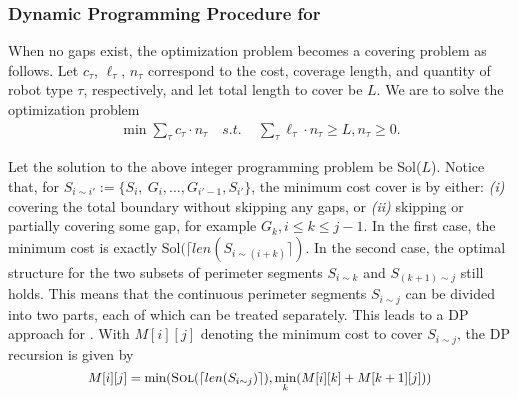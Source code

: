 \subsubsection{Dynamic Programming Procedure for \opgmc}
\def\sol{{\sc Sol}}
\def\presol{{\sc PreSolve}}
When no gaps exist, the optimization problem becomes a covering 
problem as follows. Let $c_{\tau}$, $\ell_{\tau}$, $n_{\tau}$ correspond to the cost, 
coverage length, and quantity of robot type ${\tau}$, respectively, and let total 
length to cover be $L$. We are to solve the optimization problem
\begin{align}\label{eq:opgext-ip}
    \min \sum_{\tau} c_{\tau} \cdot n_{\tau} \quad s.t.\, \quad
    \sum_{\tau} \ell_{\tau} \cdot n_{\tau} \geq L, n_{\tau}\geq 0.
\end{align}

Let the solution to the above integer programming problem be \sol($L$).
Notice that, for $S_{i\sim i'}:=\{S_i,\ G_i, \dots, 
G_{i'-1}, S_{i'}\}$, the minimum cost cover is by either: {\em (i)} 
covering the total boundary without skipping any gaps, 
%
or {\em (ii)} skipping or partially covering some gap, for example $G_k, 
i \le k \le j-1$.
%
In the first case, the minimum cost is exactly \sol$(\lceil len(S_{i\sim(i+k)}\rceil)$.
%
In the second case, the optimal structure for the two subsets of perimeter 
segments $S_{i\sim k}$ and $S_{(k+1)\sim j}$ still holds. This means that the 
continuous perimeter segments $S_{i\sim j}$ can be divided into two parts, 
each of which can be treated separately. This leads to a DP approach for \opgmc.
With $M[i][j]$ denoting the minimum cost to cover $S_{i\sim j}$, the DP recursion 
is given by
\[
	\scalebox{0.93}{$M[i][j] = \min(\textit{\sol}(\lceil len(S_{i\sim j})\rceil), \displaystyle\min_k(M[i][k]+M[k+1][j]))$}
\]

